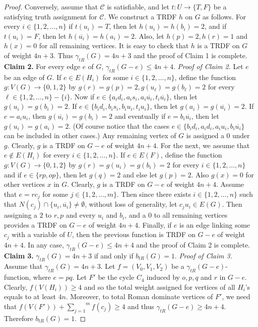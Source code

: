 \documentclass[12pt,reqno]{amsart}
\theoremstyle{plain}
\numberwithin{equation}{section}
\begin{document}
\begin{proof}
Conversely, assume that $\mathcal{C}$ is satisfiable, and let $t:U\longrightarrow \{T,F\}$ be a satisfying truth assignment for $\mathcal{C}$. We construct a TRDF $h$ on $G$ as follows. For every $i \in \{1, 2, \dots , n\}$ if $t(u_i)=T$, then let $h(u_i)=h(b_i)=2$, and if $t(u_i)=F$, then let $h(\overline{u_i})=h(a_i)=2$. Also, let $h(p)=2, h(r)=1$ and $h(x)=0$
for all remaining vertices. It is easy to check that $h$ is a TRDF on $G$ of weight $4n+3$. Thus $\gamma _{tR}(G)=4n+3$ and the proof of Claim 1 is complete.\newline
\newline
\textbf{Claim 2.} For every edge $e$ of $G$, $\gamma _{tR}(G-e)\leq 4n+4$.
\newline
\textit{Proof of Claim 2.} Let $e$ be an edge of $G$. If $e\in E(H_{i})$ for some $i\in \{1,2,\dots ,n\}$, define the function $g:V(G)\longrightarrow \{0,1,2\}$ by $g(r)=g(p)=2, g(u_\ell)=g(b_\ell)=2$ for every $\ell \in \{1,2,\dots ,n\}-\{i\}$.
Now if $e\in \{a_id_i, a_is_i, a_i\overline{u_i}, t_i\overline{u_i}\}$, then let $g(u_i)=g(b_i)=2$. If $e\in \{b_id_i, b_is_i, b_iu_i, t_iu_i\}$, then let $g(a_i)=g(\overline{u_i})=2$. If $e=a_iu_i$, then $g(\overline{u_i})=g(b_i)=2$ and eventually if $e=b_i\overline{u_i}$, then let $g(u_i)=g(a_i)=2$. (Of course notice that the cases $e\in \{b_id_i, a_id_i, a_iu_i, b_i\overline{u_i}\}$ can be included in other cases.)
Any remaining vertex of $G$ is assigned a $0$ under $g$. Clearly, $g$ is a TRDF on $G-e$ of weight $4n+4$. For the next, we assume that $e\notin E(H_{i})$ for every $i\in
\{1,2,\dots ,n\}$. If $e\in E(F)$, define the function $g:V(G)\longrightarrow \{0,1,2\}$ by $g(r)=g(u_{i})=g(b_{i})=2$ for every
$i\in \{1,2,\dots ,n\}$ and if $e\in \{rp, op\}$, then let $g(q)=2$ and else let $g(p)=2$. Also $g(x)=0$ for other vertices $x$ in $G$. Clearly, $g$ is a TRDF on $G-e$ of weight $4n+4$. Assume that
$e=rc_j$ for some $j\in \{1,2,\dots ,m\}$. Then since there exists $i\in \{1,2,\dots ,n\}$
such that $N(c_j)\cap \{u_i,\overline{u_i}\}\neq \emptyset$, without
loss of generality, let $c_ju_i\in E(G)$. Then assigning a $2$ to $r,p$
and every $u_i$ and $b_i$, and a $0$ to all remaining vertices provides
a TRDF on $G-e$ of weight $4n+4$. Finally, if $e$ is an edge linking
some $c_j$ with a variable of $U$, then the previous function is
TRDF on $G-e$ of weight $4n+4$. In any case, $\gamma _{tR}(G-e)\leq
4n+4$ and the proof of Claim 2 is complete.\newline
\newline
\textbf{Claim 3.} $\gamma _{tR}(G)=4n+3$ if and only if $b_{tR}(G)=1.$
\newline
\textit{Proof of Claim 3.} Assume that $\gamma _{tR}(G)=4n+3$. Let $f=(V_0, V_1, V_2)$ be a $\gamma _{tR}(G-e)$-function, where $e=pq$. Let $F'$ be the cycle $C_4$ induced by $o,p,q$ and $r$ in $G-e$.
Clearly, $f(V(H_i))\geq 4$ and so the total weight assigned for vertices
of all $H_i$'s equals to at least $4n$. Moreover, to total Roman dominate
vertices of $F'$, we need that $f(V(F'))+\overset{m}{\underset{j=1}{\sum }}f(c_j)\geq 4$ and thus $\gamma _{tR}(G-e)\geq 4n+4$. Therefore $b_{tR}(G)=1$.


\end{proof}
\end{document}

